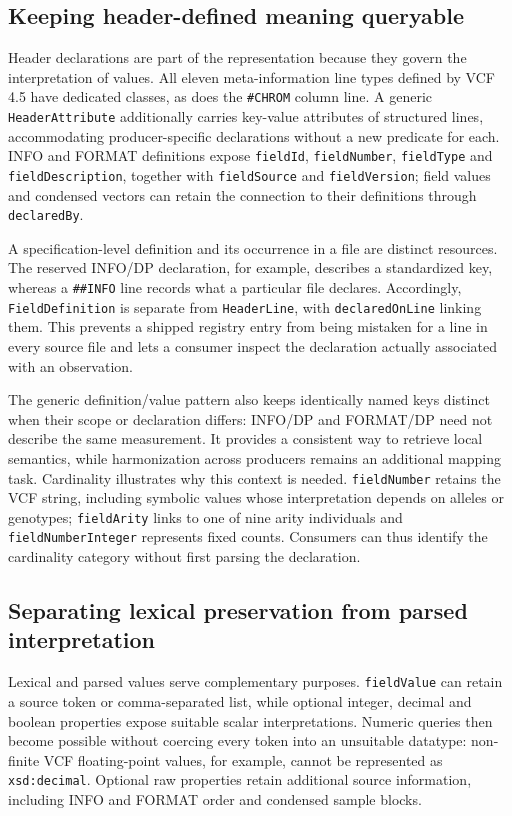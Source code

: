 \documentclass{ceurart}
\newcommand{\term}[1]{\texttt{#1}}
\begin{document}
\subsection{Keeping header-defined meaning queryable}

Header declarations are part of the representation because they govern the interpretation of values. All eleven meta-information line types defined by VCF 4.5 have dedicated classes, as does the \term{\#CHROM} column line. A generic \term{HeaderAttribute} additionally carries key-value attributes of structured lines, accommodating producer-specific declarations without a new predicate for each. INFO and FORMAT definitions expose \term{fieldId}, \term{fieldNumber}, \term{fieldType} and \term{fieldDescription}, together with \term{fieldSource} and \term{fieldVersion}; field values and condensed vectors can retain the connection to their definitions through \term{declaredBy}.

A specification-level definition and its occurrence in a file are distinct resources. The reserved INFO/DP declaration, for example, describes a standardized key, whereas a \term{\#\#INFO} line records what a particular file declares. Accordingly, \term{FieldDefinition} is separate from \term{HeaderLine}, with \term{declaredOnLine} linking them. This prevents a shipped registry entry from being mistaken for a line in every source file and lets a consumer inspect the declaration actually associated with an observation.

The generic definition/value pattern also keeps identically named keys distinct when their scope or declaration differs: INFO/DP and FORMAT/DP need not describe the same measurement. It provides a consistent way to retrieve local semantics, while harmonization across producers remains an additional mapping task. Cardinality illustrates why this context is needed. \term{fieldNumber} retains the VCF string, including symbolic values whose interpretation depends on alleles or genotypes; \term{fieldArity} links to one of nine arity individuals and \term{fieldNumberInteger} represents fixed counts. Consumers can thus identify the cardinality category without first parsing the declaration.

\subsection{Separating lexical preservation from parsed interpretation}

Lexical and parsed values serve complementary purposes. \term{fieldValue} can retain a source token or comma-separated list, while optional integer, decimal and boolean properties expose suitable scalar interpretations. Numeric queries then become possible without coercing every token into an unsuitable datatype: non-finite VCF floating-point values, for example, cannot be represented as \term{xsd:decimal}. Optional raw properties retain additional source information, including INFO and FORMAT order and condensed sample blocks.
\end{document}
